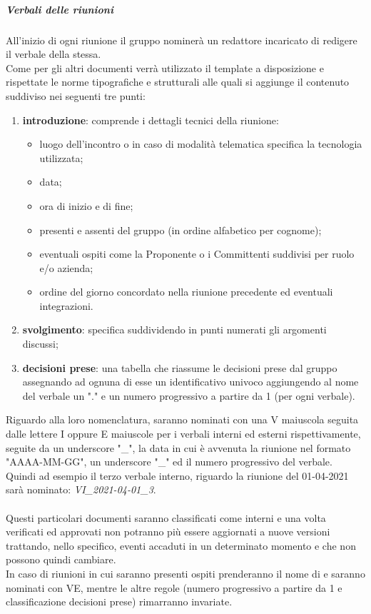     	\subparagraph{Verbali delle riunioni}
    	All'inizio di ogni riunione il gruppo nominerà un redattore incaricato di redigere il verbale della stessa.\\
    	Come per gli altri documenti verrà utilizzato il template a disposizione e rispettate le norme tipografiche e strutturali alle quali si aggiunge il contenuto suddiviso nei seguenti tre punti:
    	\begin{enumerate}
    		\item \textbf{introduzione}: comprende i dettagli tecnici della riunione:
    		\begin{itemize}
    			\item luogo dell'incontro o in caso di modalità telematica specifica la tecnologia utilizzata;
    			\item data;
    			\item ora di inizio e di fine;
    			\item presenti e assenti del gruppo (in ordine alfabetico per cognome);
    			\item eventuali ospiti come la Proponente o i Committenti suddivisi per ruolo e/o azienda;
    			\item ordine del giorno concordato nella riunione precedente ed eventuali integrazioni.
    		\end{itemize}
    		\item \textbf{svolgimento}: specifica suddividendo in punti numerati gli argomenti discussi;
    		\item \textbf{decisioni prese}: una tabella che riassume le decisioni prese dal gruppo assegnando ad ognuna di esse un identificativo univoco aggiungendo al nome del verbale un "." e un numero progressivo a partire da 1 (per ogni verbale).
    	\end{enumerate}
    	Riguardo alla loro nomenclatura, saranno nominati con una V maiuscola seguita dalle lettere I oppure E maiuscole per i verbali interni ed esterni rispettivamente, seguite da un underscore "\_", la data in cui è avvenuta la riunione nel formato "AAAA-MM-GG", un underscore "\_" ed il numero progressivo del verbale. Quindi ad esempio il terzo verbale interno, riguardo la riunione del 01-04-2021 sarà nominato: \textit{VI\_2021-04-01\_3}.\\
    	\\Questi particolari documenti saranno classificati come interni e una volta verificati ed approvati non potranno più essere aggiornati a nuove versioni trattando, nello specifico, eventi accaduti in un determinato momento e che non possono quindi cambiare.
    	\\In caso di riunioni in cui saranno presenti ospiti prenderanno il nome di  e saranno nominati con VE, mentre le altre regole (numero progressivo a partire da 1 e classificazione decisioni prese) rimarranno invariate.
	
